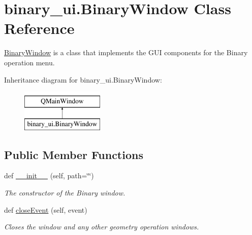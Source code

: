 \hypertarget{classbinary__ui_1_1_binary_window}{}\section{binary\+\_\+ui.\+Binary\+Window Class Reference}
\label{classbinary__ui_1_1_binary_window}


\hyperlink{classbinary__ui_1_1_binary_window}{Binary\+Window} is a class that implements the G\+UI components for the Binary operation menu.  


Inheritance diagram for binary\+\_\+ui.\+Binary\+Window\+:\begin{figure}[H]
\begin{center}
\leavevmode
\includegraphics[height=2.000000cm]{classbinary__ui_1_1_binary_window}
\end{center}
\end{figure}
\subsection*{Public Member Functions}
\begin{DoxyCompactItemize}
\item 
def \hyperlink{classbinary__ui_1_1_binary_window_a2bc9146b516f338d24aa00087b8736bf}{\+\_\+\+\_\+init\+\_\+\+\_\+} (self, path=\char`\"{}\char`\"{})
\begin{DoxyCompactList}\small\item\em The constructor of the Binary window. \end{DoxyCompactList}\item 
\mbox{\label{classbinary__ui_1_1_binary_window_a6d51e01a73e062679bab62190bacd085}} 
def \hyperlink{classbinary__ui_1_1_binary_window_a6d51e01a73e062679bab62190bacd085}{close\+Event} (self, event)
\begin{DoxyCompactList}\small\item\em Closes the window and any other geometry operation windows. \end{DoxyCompactList}\end{DoxyCompactItemize}
